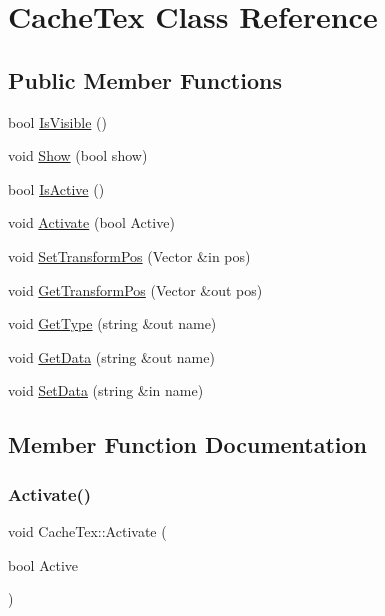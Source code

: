 \hypertarget{class_cache_tex}{}\section{Cache\+Tex Class Reference}
\label{class_cache_tex}
\subsection*{Public Member Functions}
\begin{DoxyCompactItemize}
\item 
bool \hyperlink{class_cache_tex_a343b3c50d82100c9ab449ca7826546a3}{Is\+Visible} ()
\item 
void \hyperlink{class_cache_tex_ad7d78ff9e77559cc4c0943f93d5bb762}{Show} (bool show)
\item 
bool \hyperlink{class_cache_tex_aae46eb99479c83fd50cbe81a5e02254c}{Is\+Active} ()
\item 
void \hyperlink{class_cache_tex_a413354a501ffa3b28bae3d9adb799b76}{Activate} (bool Active)
\item 
void \hyperlink{class_cache_tex_a8d008a0e6540607f5aa1be2873dc89ea}{Set\+Transform\+Pos} (Vector \&in pos)
\item 
void \hyperlink{class_cache_tex_a0462e888ac55e8eaf5ffbc8d5b73c427}{Get\+Transform\+Pos} (Vector \&out pos)
\item 
void \hyperlink{class_cache_tex_a320c7b72655659a76350bf80db3b0be2}{Get\+Type} (string \&out name)
\item 
void \hyperlink{class_cache_tex_ad5141c707c0a051e3ba673953b684747}{Get\+Data} (string \&out name)
\item 
void \hyperlink{class_cache_tex_ae47759d1324822fdeaeab4ae051c2feb}{Set\+Data} (string \&in name)
\end{DoxyCompactItemize}


\subsection{Member Function Documentation}
\hypertarget{class_cache_tex_a413354a501ffa3b28bae3d9adb799b76}{}\label{class_cache_tex_a413354a501ffa3b28bae3d9adb799b76} 
\subsubsection{\texorpdfstring{Activate()}{Activate()}}
{\footnotesize\ttfamily void Cache\+Tex\+::\+Activate (\begin{DoxyParamCaption}\item[{bool}]{Active }\end{DoxyParamCaption})}

